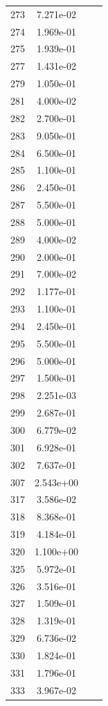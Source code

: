 \documentclass[12pt]{article}
\begin{document}
\begin{longtable}{@{}cccc@{}}
273 & 7.271e-02 &  &  \\
274 & 1.969e-01 &  &  \\
275 & 1.939e-01 &  &  \\
277 & 1.431e-02 &  &  \\
279 & 1.050e-01 &  &  \\
281 & 4.000e-02 &  &  \\
282 & 2.700e-01 &  &  \\
283 & 9.050e-01 &  &  \\
284 & 6.500e-01 &  &  \\
285 & 1.100e-01 &  &  \\
286 & 2.450e-01 &  &  \\
287 & 5.500e-01 &  &  \\
288 & 5.000e-01 &  &  \\
289 & 4.000e-02 &  &  \\
290 & 2.000e-01 &  &  \\
291 & 7.000e-02 &  &  \\
292 & 1.177e-01 &  &  \\
293 & 1.100e-01 &  &  \\
294 & 2.450e-01 &  &  \\
295 & 5.500e-01 &  &  \\
296 & 5.000e-01 &  &  \\
297 & 1.500e-01 &  &  \\
298 & 2.251e-03 &  &  \\
299 & 2.687e-01 &  &  \\
300 & 6.779e-02 &  &  \\
301 & 6.928e-01 &  &  \\
302 & 7.637e-01 &  &  \\
307 & 2.543e+00 &  &  \\
317 & 3.586e-02 &  &  \\
318 & 8.368e-01 &  &  \\
319 & 4.184e-01 &  &  \\
320 & 1.100e+00 &  &  \\
325 & 5.972e-01 &  &  \\
326 & 3.516e-01 &  &  \\
327 & 1.509e-01 &  &  \\
328 & 1.319e-01 &  &  \\
329 & 6.736e-02 &  &  \\
330 & 1.824e-01 &  &  \\
331 & 1.796e-01 &  &  \\
333 & 3.967e-02 &  &  \\

\end{longtable}
\end{document}
